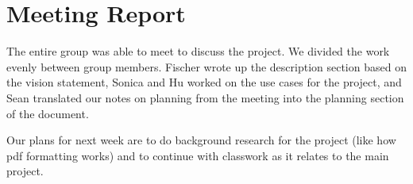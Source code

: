 \section{Meeting Report}

The entire group was able to meet to discuss the project. We divided the work evenly between group members. Fischer wrote up the description section based on the vision statement, Sonica and Hu worked on the use cases for the project, and Sean translated our notes on planning from the meeting into the planning section of the document.

Our plans for next week are to do background research for the project (like how pdf formatting works) and to continue with classwork as it relates to the main project.